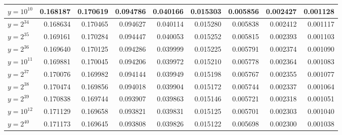 \documentclass{article}
\theoremstyle{definition}
\begin{document}
\begin{table}[h!]
{\begin{tabular}{l|rrrrrrrr}
            \hline
            $y = 10^{10}$            & 0.168187 & 0.170619              & 0.094786              & 0.040166              & 0.015303              & 0.005856              & 0.002427              & 0.001128              \\
            \hline
            $y = 2^{34}$             & 0.168634 & 0.170465              & 0.094627              & 0.040114              & 0.015280              & 0.005838              & 0.002412              & 0.001117              \\
            $y = 2^{35}$             & 0.169161 & 0.170284              & 0.094447              & 0.040053              & 0.015252              & 0.005815              & 0.002393              & 0.001103              \\
            $y = 2^{36}$             & 0.169640 & 0.170125              & 0.094286              & 0.039999              & 0.015225              & 0.005791              & 0.002374              & 0.001090              \\
            \hline
            $y = 10^{11}$            & 0.169881 & 0.170045              & 0.094206              & 0.039972              & 0.015210              & 0.005778              & 0.002364              & 0.001083              \\
            \hline
            $y = 2^{37}$             & 0.170076 & 0.169982              & 0.094144              & 0.039949              & 0.015198              & 0.005767              & 0.002355              & 0.001077              \\
            $y = 2^{38}$             & 0.170474 & 0.169856              & 0.094018              & 0.039904              & 0.015172              & 0.005744              & 0.002337              & 0.001064              \\
            $y = 2^{39}$             & 0.170838 & 0.169744              & 0.093907              & 0.039863              & 0.015146              & 0.005721              & 0.002318              & 0.001051              \\
            \hline
            $y = 10^{12}$            & 0.171129 & 0.169658              & 0.093821              & 0.039831              & 0.015125              & 0.005701              & 0.002303              & 0.001040              \\
            \hline
            $y = 2^{40}$             & 0.171173 & 0.169645              & 0.093808              & 0.039826              & 0.015122              & 0.005698              & 0.002300              & 0.001038              \\

\end{tabular}}
\end{table}
\end{document}
